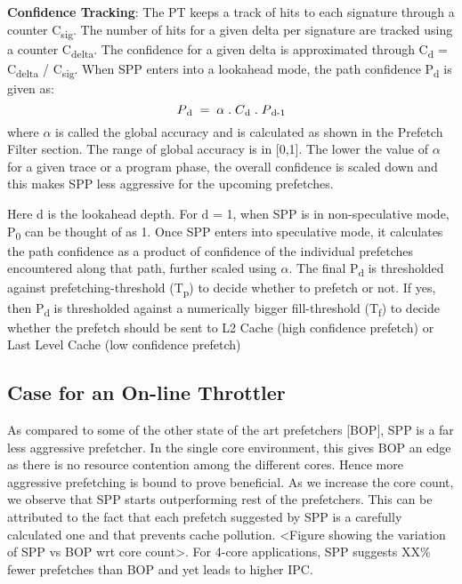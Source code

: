 \documentclass{sig-alternate}
\begin{document}
\textbf{Confidence Tracking}: The PT keeps a track of hits to each signature through a counter C\textsubscript{sig}. 
The number of hits for a given delta per signature are tracked using a counter C\textsubscript{delta}. 
The confidence for a given delta is approximated through C\textsubscript{d} = C\textsubscript{delta} / C\textsubscript{sig}. 
When SPP enters into a lookahead mode, the path confidence P\textsubscript{d} is given as:
$$P\textsubscript{d} \;=\; \alpha  \;.\;  C\textsubscript{d}  \;.\;  P\textsubscript{d-1}$$ where $\alpha$ is called the global accuracy and is calculated as shown in the Prefetch Filter section. 
The range of global accuracy is in [0,1]. 
The lower the value of $\alpha$ for a given trace or a program phase, the overall confidence is scaled down and this makes SPP less aggressive for the upcoming prefetches.

Here d is the lookahead depth. 
For d = 1, when SPP is in non-speculative mode, P\textsubscript{0} can be thought of as 1. 
Once SPP enters into speculative mode, it calculates the path confidence as a product of confidence of the individual prefetches encountered along that path, further scaled using $\alpha$. 
The final P\textsubscript{d} is thresholded against prefetching-threshold (T\textsubscript{p}) to decide whether to prefetch or not. 
If yes, then P\textsubscript{d} is thresholded against a numerically bigger fill-threshold (T\textsubscript{f}) to decide whether the prefetch should be sent to L2 Cache (high confidence prefetch) or Last Level Cache (low confidence prefetch)

\subsection{Case for an On-line Throttler}
As compared to some of the other state of the art prefetchers [BOP], SPP is a far less aggressive prefetcher. 
In the single core environment, this gives BOP an edge as there is no resource contention among the different cores. 
Hence more aggressive prefetching is bound to prove beneficial. 
As we increase the core count, we observe that SPP starts outperforming rest of the prefetchers. 
This can be attributed to the fact that each prefetch suggested by SPP is a carefully calculated one and that prevents cache pollution. <Figure showing the variation of SPP vs BOP wrt core count>. 
For 4-core applications, SPP suggests XX\% fewer prefetches than BOP and yet leads to higher IPC.
\end{document}

